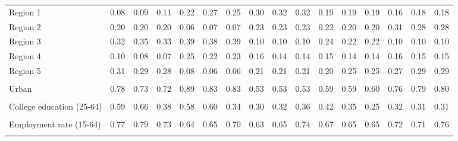 \begin{tabular}{l*{15}{c}}
\\
Region 1 & 0.08 & 0.09 & 0.11 & 0.22 & 0.27 & 0.25 & 0.30 & 0.32 & 0.32 & 0.19 & 0.19 & 0.19 & 0.16 & 0.18 & 0.18 \\
Region 2 & 0.20 & 0.20 & 0.20 & 0.06 & 0.07 & 0.07 & 0.23 & 0.23 & 0.23 & 0.22 & 0.20 & 0.20 & 0.31 & 0.28 & 0.28 \\
Region 3 & 0.32 & 0.35 & 0.33 & 0.39 & 0.38 & 0.39 & 0.10 & 0.10 & 0.10 & 0.24 & 0.22 & 0.22 & 0.10 & 0.10 & 0.10 \\
Region 4 & 0.10 & 0.08 & 0.07 & 0.25 & 0.22 & 0.23 & 0.16 & 0.14 & 0.14 & 0.15 & 0.14 & 0.14 & 0.16 & 0.15 & 0.15  \\
Region 5 & 0.31 & 0.29 & 0.28 & 0.08 & 0.06 & 0.06 & 0.21 & 0.21 & 0.21 & 0.20 & 0.25 & 0.25 & 0.27 & 0.29 & 0.29 \\
\\
Urban & 0.78 & 0.73 & 0.72 & 0.89 & 0.83 & 0.83 & 0.53 & 0.53 & 0.53 & 0.59 & 0.59 & 0.60 & 0.76 & 0.79 & 0.80 \\
\\
College education (25-64) & 0.59 & 0.66 & 0.38 & 0.58 & 0.60 & 0.34 & 0.30 & 0.32 & 0.36 & 0.42 & 0.35 & 0.25 & 0.32 & 0.31 & 0.31\\
\\
Employment rate (15-64) & 0.77 & 0.79 & 0.73 & 0.64 & 0.65 & 0.70 & 0.63 & 0.65 & 0.74 & 0.67 & 0.65 & 0.65 & 0.72 & 0.71 & 0.76 \\
\\
\bottomrule
\end{tabular}